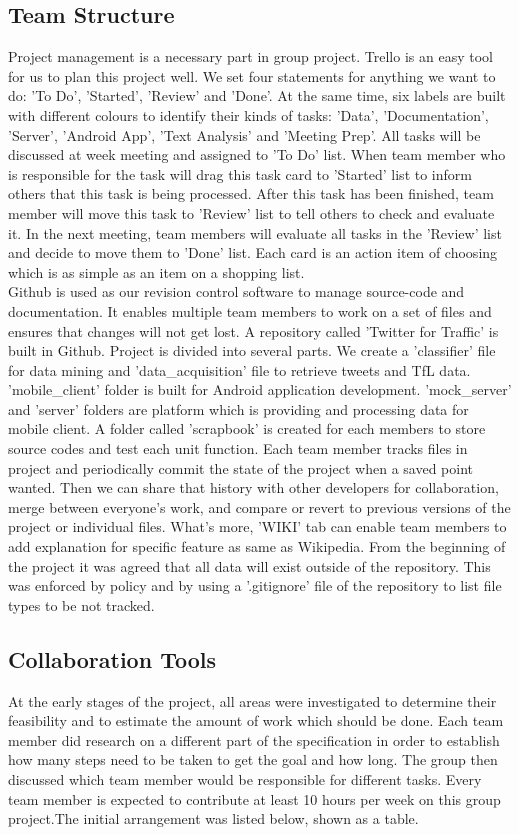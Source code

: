 \subsection{Team Structure}
Project management is a necessary part in group project. Trello is an easy tool for us to plan this project well. We set four statements for anything we want to do: 'To Do', 'Started', 'Review' and 'Done'. At the same time, six labels are built with different colours to identify their kinds of tasks: 'Data', 'Documentation', 'Server', 'Android App', 'Text Analysis' and 'Meeting Prep'. All tasks will be discussed at week meeting and assigned to 'To Do' list. When team member who is responsible for the task will drag this task card to 'Started' list to inform others that this task is being processed. After this task has been finished, team member will move this task to 'Review' list to tell others to check and evaluate it. In the next meeting, team members will evaluate all tasks in the 'Review' list and decide to move them to 'Done' list. Each card is an action item of choosing which is as simple as an item on a shopping list.\\
Github is used as our revision control software to manage source-code and documentation. It enables multiple team members to work on a set of files and ensures that changes will not get lost. A repository called 'Twitter for Traffic' is built in Github. Project is divided into several parts. We create a 'classifier' file for data mining and 'data\_acquisition' file to retrieve tweets and TfL data. 'mobile\_client' folder is built for Android application development. 'mock\_server' and 'server' folders are platform which is providing and processing data for mobile client. A folder called 'scrapbook' is created for each members to store source codes and test each unit function. Each team member tracks files in project and periodically commit the state of the project when a saved point wanted. Then we can share that history with other developers for collaboration, merge between everyone's work, and compare or revert to previous versions of the project or individual files. What's more, 'WIKI' tab can enable team members to add explanation for specific feature as same as Wikipedia. From the beginning of the project it was agreed that all data will exist outside of the repository. This was enforced by policy and by using a '.gitignore' file of the repository to list file types to be not tracked.
\subsection{Collaboration Tools}
At the early stages of the project, all areas were investigated to determine their feasibility and to estimate the amount of work which should be done. Each team member did research on a different part of the specification in order to establish how many steps need to be taken to get the goal and how long. The group then discussed which team member would be responsible for different tasks. Every team member is expected to contribute at least 10 hours per week on this group project.The initial arrangement was listed below, shown as a table.\\


